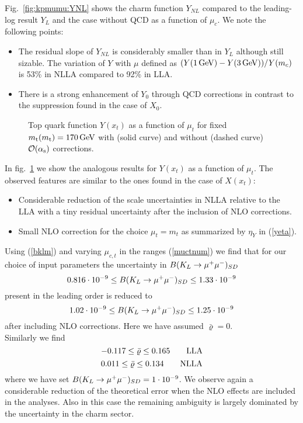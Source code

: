 Fig.\ \ref{fig:kpmumu:YNL} shows the charm function $Y_{NL}$ compared
to the leading-log result $Y_L$ and the case without QCD as a function
of $\mu_c$.  We note the following points:
\begin{itemize}
\item
The residual slope of $Y_{NL}$ is considerably smaller than
in $Y_L$ although still sizable. The variation of $Y$ with $\mu$
defined as $(Y(1\, {\rm GeV})-Y(3\, {\rm GeV}))/Y(m_c)$ is 53\% in NLLA compared
to 92\% in LLA.
\item
There is a strong enhancement of $Y_0$ through QCD corrections
in contrast to the suppression found in the case of $X_0$.
\end{itemize}

\begin{figure}[hbt]
\vspace{0.10in}
\centerline{
\epsfysize=5in
 }
\vspace{0.08in}
\caption[]{
Top quark function $Y(x_t)$ as a function of $\mu_t$ for fixed
$m_{\rm t}(m_{\rm t})=170\, {\rm GeV}$ with (solid curve) and without (dashed curve) ${\cal O}(\alpha_{\rm s})$
corrections.
\label{fig:kpmumu:Y}}
\end{figure}

In fig.\ \ref{fig:kpmumu:Y} we show the analogous results for $Y(x_t)$
as a function of $\mu_t$. The observed features are similar to the ones
found in the case of $X(x_t)$:
\begin{itemize}
\item
Considerable reduction of the scale uncertainties in NLLA
relative to the LLA with a tiny residual uncertainty after the
inclusion of NLO corrections.
\item
Small NLO correction for the choice $\mu_t=m_t$ as summarized
by $\eta_Y$ in (\ref{yeta}).
\end{itemize}
Using (\ref{bklm}) and varying $\mu_{c,t}$ in the ranges (\ref{muctnum})
we find that for our choice of input parameters the uncertainty in
$B(K_L \to \mu^+\mu^-)_{SD}$
\begin{equation}\label{varbklmLO}
0.816\cdot 10^{-9}\leq B(K_L \to \mu^+\mu^-)_{SD}\leq 1.33\cdot 10^{-9}
\end{equation}
present in the leading order is reduced to
\begin{equation}\label{varbklmNLO}
1.02\cdot 10^{-9}\leq B(K_L \to \mu^+\mu^-)_{SD}\leq 1.25\cdot 10^{-9}
\end{equation}
after including NLO corrections. Here we have assumed $\bar\varrho=0$.
\\
Similarly we find
\begin{equation}\label{varrhbLO}
-0.117\leq \bar\varrho\leq 0.165  \qquad {\rm LLA}
\end{equation}
\begin{equation}\label{varrhbNLO}
0.011\leq \bar\varrho\leq 0.134  \qquad {\rm NLLA}
\end{equation}
where we have set $B(K_L \to \mu^+\mu^-)_{SD}=1\cdot 10^{-9}$.
We observe again a considerable reduction of the theoretical
error when the NLO effects are included in the analyses. Also in this
case the remaining ambiguity is largely dominated by the uncertainty
in the charm sector.

